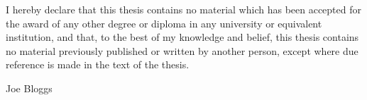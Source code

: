 

I hereby declare that this thesis contains no material which has
been accepted for the award of any other degree or diploma in any
university or equivalent institution, and that, to the best of my
knowledge and belief, this thesis contains no material previously
published or written by another person, except where due reference
is made in the text of the thesis.

\vspace*{2cm}

Joe Bloggs

